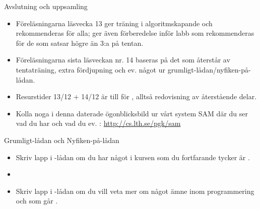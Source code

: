 \begin{Slide}{Avslutning och uppsamling}
\begin{itemize}
\item Föreläsningarna läsvecka 13 ger träning i algoritmskapande och rekommenderas för alla; ger även förberedelse inför labb  som rekommenderas för de som satsar högre än 3:a på tentan.

\item Föreläsningarna sista läsveckan nr. 14 baseras på det som återstår av tentaträning, extra fördjupning och ev. något ur grumligt-lådan/nyfiken-på-lådan.

\item Resurstider 13/12 + 14/12 är till för , alltså redovisning av återstående delar.
\item Kolla noga i denna daterade ögonblicksbild ur vårt system SAM där du ser vad du har  och vad du ev. : \url{http://cs.lth.se/pgk/sam}
\end{itemize}
\end{Slide}


\begin{Slide}{Grumligt-lådan och Nyfiken-på-lådan}
\begin{itemize}
\item Skriv lapp i -lådan om du har något  i kursen som du fortfarande tycker är .

\item[]

\item Skriv lapp i -lådan om du vill veta mer om något ämne inom programmering och som går .
\end{itemize}
\end{Slide}
